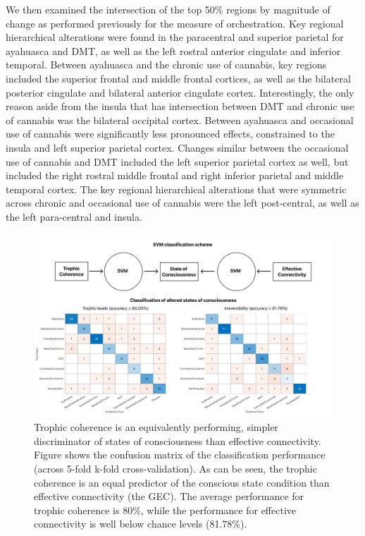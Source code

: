 We then examined the intersection of the top 50\% regions by magnitude
of change as performed previously for the measure of orchestration. Key
regional hierarchical alterations were found in the paracentral and
superior parietal for ayahuasca and DMT, as well as the left rostral
anterior cingulate and inferior temporal. Between ayahuasca and the
chronic use of cannabis, key regions included the superior frontal and
middle frontal cortices, as well as the bilateral posterior cingulate
and bilateral anterior cingulate cortex. Interestingly, the only reason
aside from the insula that has intersection between DMT and chronic use
of cannabis was the bilateral occipital cortex. Between ayahuasca and
occasional use of cannabis were significantly less pronounced effects,
constrained to the insula and left superior parietal cortex. Changes
similar between the occasional use of cannabis and DMT included the left
superior parietal cortex as well, but included the right rostral middle
frontal and right inferior parietal and middle temporal cortex. The key
regional hierarchical alterations that were symmetric across chronic and
occasional use of cannabis were the left post-central, as well as the
left para-central and insula.

\begin{figure}[h!]
    \centering
    \includegraphics[width=\textwidth]{images/Figure 7_ SVM.png}
    \caption[Trophic coherence
is an equivalently performing, simpler discriminator of states of consciousness than
effective connectivity.]{Trophic coherence
is an equivalently performing, simpler discriminator of states of consciousness than
effective connectivity. Figure shows the confusion matrix of the
classification performance (across 5-fold k-fold cross-validation). As
can be seen, the trophic coherence is an equal predictor
of the conscious state condition than effective connectivity (the GEC).
The average performance for trophic coherence is 80\%, while the
performance for effective connectivity is well below chance levels
(81.78\%).}
    \label{fig:svm}
\end{figure}

